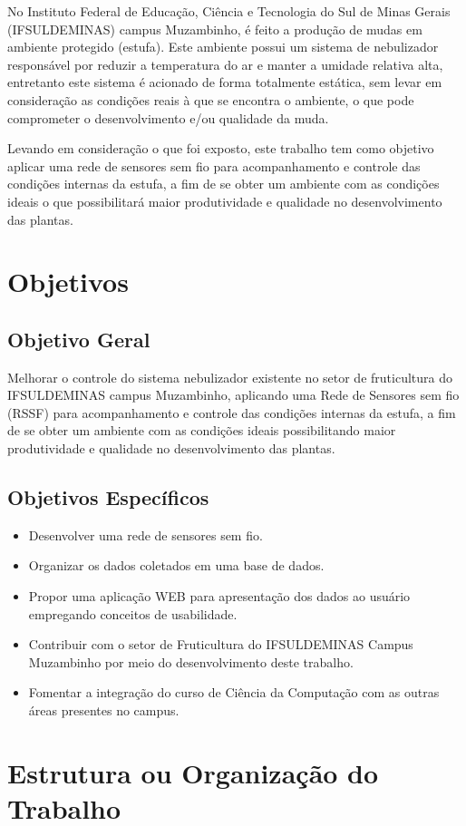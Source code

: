 No Instituto Federal de Educação, Ciência e Tecnologia do Sul de Minas Gerais (IFSULDEMINAS) campus Muzambinho, é feito a produção de mudas em ambiente protegido (estufa). Este ambiente possui um sistema de nebulizador responsável por reduzir a temperatura do ar e manter a umidade relativa alta, entretanto este sistema é acionado de forma totalmente estática, sem levar em consideração as condições reais à que se encontra o ambiente, o que pode comprometer o desenvolvimento e/ou qualidade da muda.

Levando em consideração o que foi exposto, este trabalho tem como objetivo aplicar uma rede de sensores sem fio para acompanhamento e controle das condições internas da estufa, a fim de se obter um ambiente com as condições ideais o que possibilitará maior produtividade e qualidade no desenvolvimento das plantas.

\section{Objetivos}

\subsection{Objetivo Geral}
Melhorar o controle do sistema nebulizador existente no setor de fruticultura do IFSULDEMINAS campus Muzambinho, aplicando uma Rede de Sensores sem fio (RSSF) para acompanhamento e controle das condições internas da estufa, a fim de se obter um ambiente com as condições ideais possibilitando maior produtividade e qualidade no desenvolvimento das plantas.

\subsection{Objetivos Específicos}
\begin{itemize}[itemsep=0em]
\item Desenvolver uma rede de sensores sem fio.
\item Organizar os dados coletados em uma base de dados.
\item Propor uma aplicação WEB para apresentação dos dados ao usuário empregando conceitos de usabilidade.
\item Contribuir com o setor de Fruticultura do IFSULDEMINAS Campus Muzambinho por meio do desenvolvimento deste trabalho.
\item Fomentar a integração do curso de Ciência da Computação com as outras áreas presentes no campus.
\end{itemize}

\section{Estrutura ou Organização do Trabalho}
